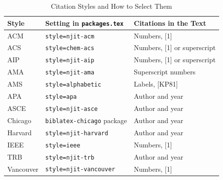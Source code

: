 \begin{table}
\centering
\caption{Citation Styles and How to Select Them}
\label{tab:style-settings}
\begin{tabular}{@{}lll@{}}
\toprule
\textbf{Style} & \textbf{Setting in \texttt{packages.tex}} & \textbf{Citations in the Text} \\
\midrule
ACM       & \texttt{style=njit-acm}  & Numbers, [1] \\
ACS       & \texttt{style=chem-acs}  & Numbers, [1] or superscript \\
AIP       & \texttt{style=njit-aip}  & Numbers, [1] or superscript \\
AMA       & \texttt{style=njit-ama}  & Superscript numbers \\
AMS       & \texttt{style=alphabetic} & Labels, [KP81] \\
APA       & \texttt{style=apa}       & Author and year \\
ASCE      & \texttt{style=njit-asce} & Author and year \\
Chicago   & \texttt{biblatex-chicago} package & Author and year \\
Harvard   & \texttt{style=njit-harvard} & Author and year \\
IEEE      & \texttt{style=ieee}      & Numbers, [1] \\
TRB       & \texttt{style=njit-trb}  & Author and year \\
Vancouver & \texttt{style=njit-vancouver} & Numbers, [1] \\
\bottomrule
\end{tabular}
\end{table}

